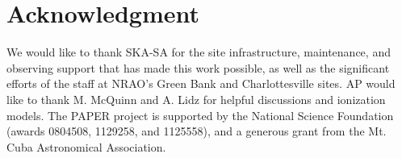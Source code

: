 \documentclass[preprint]{aastex}  %
\begin{document}
\section{Acknowledgment}

We would like to thank SKA-SA for the site infrastructure, maintenance, and observing support
that has made this work possible, as well as the significant efforts of the staff at
NRAO's Green Bank and Charlottesville sites.  AP would like to thank M. McQuinn and A. Lidz
for helpful discussions and ionization models.
The PAPER project is supported
by the National Science Foundation (awards 0804508,
1129258, and 1125558), and a generous grant
from the Mt. Cuba Astronomical Association.




\end{document}

